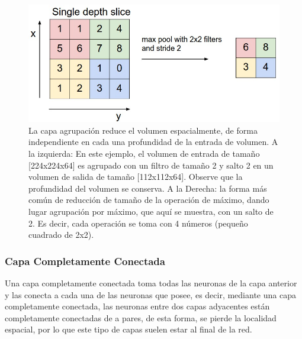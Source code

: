 \documentclass[a4paper,11pt,spanish]{book}
\begin{document}
	\begin{figure}[H]
	  \begin{center}
	   \includegraphics[width=0.8\linewidth]{./img/stanford_maxpool.jpeg}
	  \end{center}
	  \caption{La capa agrupación reduce el volumen espacialmente, de forma independiente en cada una profundidad de la entrada de volumen.
	    A la izquierda: En este ejemplo, el volumen de entrada de tamaño [224x224x64] es agrupado con un filtro de tamaño 2 y salto 2 en un volumen de salida de tamaño [112x112x64].
	    Observe que la profundidad del volumen se conserva. A la Derecha: la forma más común de reducción de tamaño de la operación de máximo, dando lugar agrupación por máximo,
	    que aquí se muestra, con un salto de 2. Es decir, cada operación se toma con 4 números (pequeño cuadrado de 2x2). \cite{Karpathy:Stanford}}
	  \label{fig:maxpool_layer}
	\end{figure}

      \subsubsection{Capa Completamente Conectada}
	Una capa completamente conectada toma todas las neuronas de la capa anterior y las conecta a cada una de las neuronas que posee, es decir,
	mediante una capa completamente conectada, las neuronas entre dos capas adyacentes están completamente conectadas de a pares, de esta forma, se pierde la localidad espacial,
	por lo que este tipo de capas suelen estar al final de la red.
\end{document}
